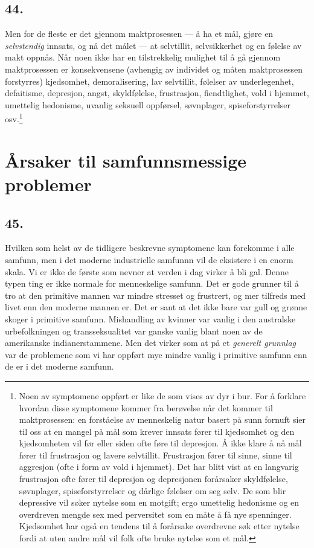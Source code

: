 \documentclass[oneside]{book}
\begin{document}
\section*{44.}
Men for de fleste er det gjennom maktprosessen --- å ha et mål, gjøre en
\emph{selvstendig} innsats, og nå det målet --- at selvtillit, selvsikkerhet og
en
følelse av makt oppnås. Når noen ikke har en tilstrekkelig mulighet til å gå
gjennom maktprosessen er konsekvensene (avhengig av individet og måten
maktprosessen forstyrres) kjedsomhet, demoralisering, lav selvtillit, følelser
av underlegenhet, defaitisme, depresjon, angst, skyldfølelse, frustrasjon,
fiendtlighet, vold i hjemmet, umettelig hedonisme, uvanlig seksuell oppførsel,
søvnplager, spiseforstyrrelser osv.\footnote{Noen av symptomene oppført er
like de som vises av dyr i bur. For å forklare hvordan disse symptomene kommer
fra berøvelse når det kommer til maktprosessen: en forståelse av menneskelig
natur basert på sunn fornuft sier til oss at en mangel på mål som krever
innsats fører til kjedsomhet og den kjedsomheten vil før eller siden ofte føre
til depresjon. Å ikke klare å nå mål fører til frustrasjon og lavere
selvtillit. Frustrasjon fører til sinne, sinne til aggresjon (ofte i form av
vold i hjemmet). Det har blitt vist at en langvarig frustrasjon ofte fører til
depresjon og depresjonen forårsaker skyldfølelse, søvnplager,
spiseforstyrrelser og dårlige følelser om seg selv. De som blir depressive vil
søker nytelse som en motgift; ergo umettelig hedonisme og en overdreven mengde
sex med perversitet som en måte å få nye spenninger. Kjedsomhet har også en
tendens til å forårsake overdrevne søk etter nytelse fordi at uten andre mål
vil folk ofte bruke nytelse som et mål.}

\chapter{Årsaker til samfunnsmessige problemer}
\section*{45.}
Hvilken som helst av de tidligere beskrevne symptomene kan forekomme i alle
samfunn, men i det moderne industrielle samfunnn vil de eksistere i en enorm
skala. Vi er ikke de første som nevner at verden i dag virker å bli gal. Denne
typen ting er ikke normale for menneskelige samfunn. Det er gode grunner til å
tro at den primitive mannen var mindre stresset og frustrert, og mer tilfreds
med livet enn den moderne mannen er. Det er sant at det ikke bare var gull og
grønne skoger i primitive samfunn. Mishandling av kvinner var vanlig i den
australske urbefolkningen og transseksualitet var ganske vanlig blant noen av
de amerikanske indianerstammene. Men det virker som at på et {\em generelt
grunnlag} var de problemene som vi har oppført mye mindre vanlig i primitive
samfunn enn de er i det moderne samfunn.
\end{document}
